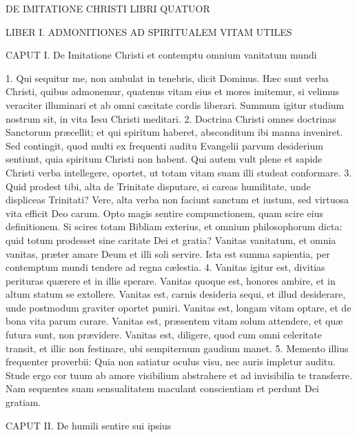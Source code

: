 \documentclass[twoside]{article}
\begin{document}
\pagestyle{empty}

\fontsize{12.5}{15}\selectfont
{}

DE IMITATIONE CHRISTI
LIBRI QUATUOR


LIBER I.
ADMONITIONES AD SPIRITUALEM VITAM UTILES


CAPUT I.
De Imitatione Christi et contemptu omnium vanitatum mundi

1. Qui sequitur me, non ambulat in tenebris, dicit Dominus. Hæc sunt verba Christi, quibus admonemur, quatenus vitam eius et mores imitemur, si velimus veraciter illuminari et ab omni cæcitate cordis liberari. Summum igitur studium nostrum sit, in vita Iesu Christi meditari.
2. Doctrina Christi omnes doctrinas Sanctorum præcellit; et qui spiritum haberet, absconditum ibi manna inveniret. Sed contingit, quod multi ex frequenti auditu Evangelii parvum desiderium sentiunt, quia spiritum Christi non habent. Qui autem vult plene et sapide Christi verba intellegere, oportet, ut totam vitam suam illi studeat conformare.
3. Quid prodest tibi, alta de Trinitate disputare, si careas humilitate, unde displiceas Trinitati? Vere, alta verba non faciunt sanctum et iustum, sed virtuosa vita efficit Deo carum. Opto magis sentire compunctionem, quam scire eius definitionem. Si scires totam Bibliam exterius, et omnium philosophorum dicta: quid totum prodesset sine caritate Dei et gratia? Vanitas vanitatum, et omnia vanitas, præter amare Deum et illi soli servire. Ista est summa sapientia, per contemptum mundi tendere ad regna cælestia.
4. Vanitas igitur est, divitias perituras quærere et in illis sperare. Vanitas quoque est, honores ambire, et in altum statum se extollere. Vanitas est, carnis desideria sequi, et illud desiderare, unde postmodum graviter oportet puniri. Vanitas est, longam vitam optare, et de bona vita parum curare. Vanitas est, præsentem vitam solum attendere, et quæ futura sunt, non prævidere. Vanitas est, diligere, quod cum omni celeritate transit, et illic non festinare, ubi sempiternum gaudium manet.
5. Memento illius frequenter proverbii: Quia non satiatur oculus visu, nec auris impletur auditu. Stude ergo cor tuum ab amore visibilium abstrahere et ad invisibilia te transferre. Nam sequentes suam sensualitatem maculant conscientiam et perdunt Dei gratiam.


CAPUT II.
De humili sentire sui ipsius
\end{document}
